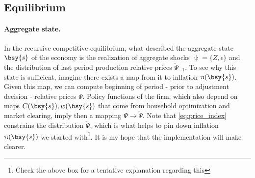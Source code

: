 \documentclass[a4paper,10pt]{article}  %
\begin{document}
\subsection{Equilibrium} %
\label{sub:equilibrium}

\paragraph{\normalfont\bf Aggregate state.} 
In the recursive competitive equilibrium, what described the aggregate state $ \bsy{s} $ of the economy is the realization of aggregate
shocks $ \uppsi =\big\{ Z, \epsilon \big\} $ and the distribution of last period production relative prices $ \widetilde{\Psi}_{-1} $.
To see why this state is sufficient, imagine there exists a map from it to inflation $ \uppi(\bsy{s} ) $. Given this map, we can
compute beginning of period - prior to adjustment decision - relative prices $\Psi$. Policy functions of the firm, which also depend on
maps $ C(\bsy{s} ), w(\bsy{s} )$ that come from household optimization and market clearing, imply then a mapping $ \Psi \rightarrow
\widetilde{\Psi} $. Note that \eqref{eq:price_index} constrains the distribution $ \widetilde{\Psi} $, which is what helps to pin down
inflation $\uppi(
\bsy{s})$ we started with\footnote{Check the above box for a tentative explanation regarding this}. It is my hope that the
implementation will make clearer.
\end{document}
